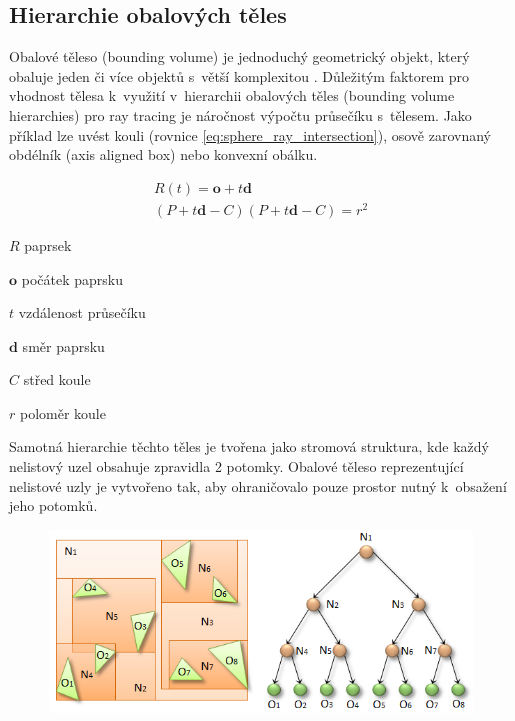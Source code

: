 \subsection{Hierarchie obalových těles} \label{sec:BVH}
Obalové těleso (bounding volume) je jednoduchý geometrický objekt, který obaluje jeden či více objektů s~větší komplexitou \cite{ericson_2005}. Důležitým faktorem pro vhodnost tělesa k~využití v~hierarchii obalových těles (bounding volume hierarchies) pro ray tracing je náročnost výpočtu průsečíku s~tělesem. Jako příklad lze uvést kouli (rovnice \ref{eq:sphere_ray_intersection}), osově zarovnaný obdélník (axis aligned box) nebo konvexní obálku. 

\begin{equation} \label{eq:sphere_ray_intersection}
	\begin{gathered}
	    R(t) = \textbf{o} + t\textbf{d}  \\
	    
	    (P + t\textbf{d} - C) (P + t\textbf{d} - C) = r^2
	    
	\end{gathered}
\end{equation}

\begin{eqexpl}[60mm]
\item{$R$} paprsek
\item{$\textbf{o}$} počátek paprsku
\item{$t$} vzdálenost průsečíku
\item{$\textbf{d}$} směr paprsku
\item{$C$} střed koule
\item{$r$} poloměr koule
\end{eqexpl}

Samotná hierarchie těchto těles je tvořena jako stromová struktura, kde každý nelistový uzel obsahuje zpravidla 2 potomky. Obalové těleso reprezentující nelistové uzly je vytvořeno tak, aby ohraničovalo pouze prostor nutný k~obsažení jeho potomků.

\begin{figure}[H]
	\centering
	\includegraphics[scale=0.5]{images/fig03-bvh.png}
	\captionsetup{justification=centering}
	\label{fig:slabs}
\end{figure}

